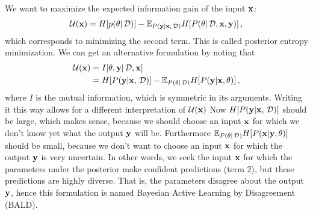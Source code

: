 We want to maximize the expected information gain of the input ${\bf x}$:
\begin{align}
	\mathcal{U}({\bf x})
	= H[p(\theta | \,\mathcal{D})]
	- \mathbb{E}_{{P({\bf y} | {\bf x}, \,\mathcal{D})}} H[{P(\theta | \,\mathcal{D}, {\bf x}, {\bf y})}] \,,
\end{align}
which corresponds to minimizing the second term. This is called posterior entropy minimization.
We can get an alternative formulation by noting that
\begin{align}
	\mathcal{U}({\bf x})
	&= I[\theta, {\bf y} | \,\mathcal{D}, {\bf x}] \\
	&= H[{P({\bf y} | {\bf x}, \,\mathcal{D})}]
	- \mathbb{E}_{{P(\theta | \,\mathcal{D})}} H[{P({\bf y} | {\bf x}, \theta)}] \,,
\end{align}
where $I$ is the mutual information, which is symmetric in its arguments. Writing it this way allows for a different interpretation of $\mathcal{U}({\bf x})$
Now $H[{P({\bf y} | {\bf x}, \,\mathcal{D})}]$ should be large, which makes sense, because we should choose an input ${\bf x}$ for which we don't know yet what the output ${\bf y}$ will be. Furthermore $\mathbb{E}_{{P(\theta | \,\mathcal{D})}} H[{P({\bf x} | {\bf y}, \theta)}]$ should be small, because we don't want to choose an input ${\bf x}$ for which the output ${\bf y}$ is very uncertain.
In other words, we seek the input ${\bf x}$ for which the parameters under the posterior make confident predictions (term 2), but these predictions are highly diverse. That is, the parameters disagree about the output ${\bf y}$, hence this formulation is named Bayesian Active Learning by Disagreement (BALD).
